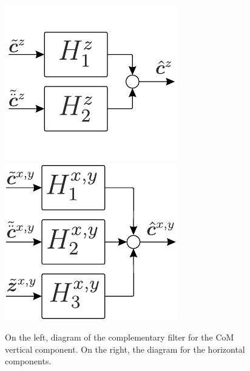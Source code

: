\begin{figure}
\begin{center}
%
%   
\includegraphics[width=0.35\columnwidth]{fig/block-diagram-z}\hspace{0.1\columnwidth}
\includegraphics[width=0.35\columnwidth]{fig/block-diagram-x-y}

\end{center}
\caption{On the left, diagram of the complementary filter for the CoM vertical component. On the right, the diagram for the horizontal components.}
\label{fig:cf_com_vertical}
\end{figure}

